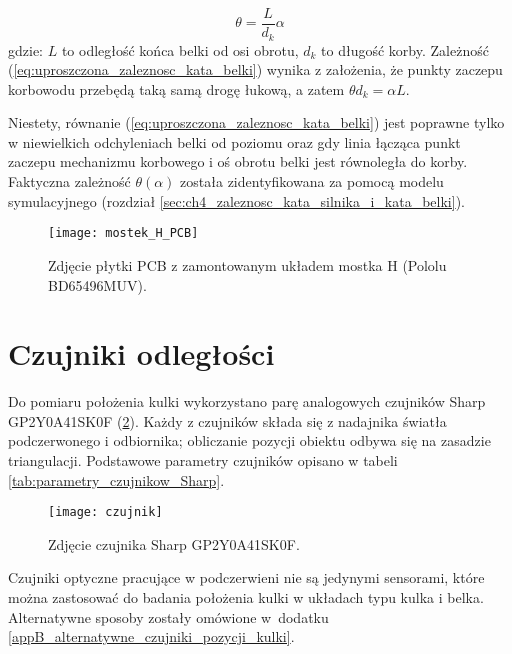 \begin{equation}\label{eq:uproszczona_zaleznosc_kata_belki}
    \theta = \frac{L}{d_k} \alpha
\end{equation}
gdzie: $L$ to odległość końca belki od osi obrotu, $d_k$ to długość korby. Zależność (\ref{eq:uproszczona_zaleznosc_kata_belki}) wynika z założenia, że punkty zaczepu korbowodu przebędą taką samą drogę łukową, a zatem $\theta d_k = \alpha L$.

Niestety, równanie (\ref{eq:uproszczona_zaleznosc_kata_belki}) jest poprawne tylko w niewielkich odchyleniach belki od poziomu oraz gdy linia łącząca punkt zaczepu mechanizmu korbowego i oś obrotu belki jest równoległa do korby. Faktyczna zależność $\theta(\alpha)$ została zidentyfikowana za pomocą modelu symulacyjnego (rozdział \ref{sec:ch4_zaleznosc_kata_silnika_i_kata_belki}).

\begin{figure}[H]
    \centering
    \texttt{[image: mostek\_H\_PCB]}
    \caption{Zdjęcie płytki PCB z zamontowanym układem mostka H (Pololu BD65496MUV).}
    \label{fig:mostek_H_PCB}
\end{figure}

\section{Czujniki odległości}
\label{sec:ch3_czujniki_odleglosci}

Do pomiaru położenia kulki wykorzystano parę analogowych czujników Sharp GP2Y0A41SK0F (\cref{fig:czujnik_sharp}). Każdy z czujników składa się z nadajnika światła podczerwonego i odbiornika; obliczanie pozycji obiektu odbywa się na zasadzie triangulacji. Podstawowe parametry czujników opisano w tabeli \ref{tab:parametry_czujnikow_Sharp}.

\begin{figure}[h]
    \centering
    \texttt{[image: czujnik]}
    \caption{Zdjęcie czujnika Sharp GP2Y0A41SK0F.}
    \label{fig:czujnik_sharp}
\end{figure}

Czujniki optyczne pracujące w podczerwieni nie są jedynymi sensorami, które można zastosować do badania położenia kulki w układach typu kulka i belka. Alternatywne sposoby zostały omówione w~dodatku \ref{appB_alternatywne_czujniki_pozycji_kulki}.

